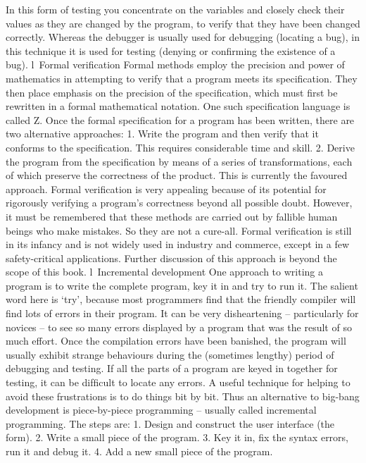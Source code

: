 In this form of testing you concentrate on the variables and closely check their values as they are changed by the program, to verify that they have been changed correctly.
Whereas the debugger is usually used for debugging (locating a bug), in this technique it is used for testing (denying or conﬁrming the existence of a bug).
l Formal veriﬁcation
Formal methods employ the precision and power of mathematics in attempting to
verify that a program meets its speciﬁcation. They then place emphasis on the precision of the speciﬁcation, which must ﬁrst be rewritten in a formal mathematical notation. One such speciﬁcation language is called Z. Once the formal speciﬁcation for a program has been written, there are two alternative approaches:
1.	Write the program and then verify that it conforms to the speciﬁcation. This requires considerable time and skill.
2.	Derive the program from the speciﬁcation by means of a series of transformations, each of which preserve the correctness of the product. This is currently the favoured approach.
Formal veriﬁcation is very appealing because of its potential for rigorously verifying a program’s correctness beyond all possible doubt. However, it must be remembered that these methods are carried out by fallible human beings who make mistakes. So they are not a cure-all.
Formal veriﬁcation is still in its infancy and is not widely used in industry and commerce, except in a few safety-critical applications. Further discussion of this approach is beyond the scope of this book.
l Incremental development
One approach to writing a program is to write the complete program, key it in and try to run it. The salient word here is ‘try’, because most programmers ﬁnd that the friendly compiler will ﬁnd lots of errors in their program. It can be very disheartening – particularly for novices – to see so many errors displayed by a program that was the result 
of so much effort. Once the compilation errors have been banished, the program will usually exhibit strange behaviours during the (sometimes lengthy) period of debugging and testing. If all the parts of a program are keyed in together for testing, it can be difﬁcult to locate any errors. A useful technique for helping to avoid these frustrations is to do things bit by bit. Thus an alternative to big-bang development is piece-by-piece programming – usually called incremental programming. The steps are:
1.	Design and construct the user interface (the form).
2.	Write a small piece of the program.
3.	Key it in, ﬁx the syntax errors, run it and debug it.
4.	Add a new small piece of the program.
